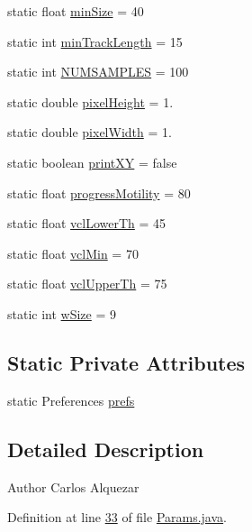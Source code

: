 \begin{DoxyCompactItemize}
static float \hyperlink{classdata_1_1_params_a0aac8d82501e8bd6df290478d853662b}{min\+Size} = 40
\item 
static int \hyperlink{classdata_1_1_params_aa730fe10ba7a04b3871e8ff2ea8cc834}{min\+Track\+Length} = 15
\item 
static int \hyperlink{classdata_1_1_params_ae808f1c980157cfd070c6e09e587e2aa}{N\+U\+M\+S\+A\+M\+P\+L\+ES} = 100
\item 
static double \hyperlink{classdata_1_1_params_a193425ff40a106f84f7980effb603136}{pixel\+Height} = 1.
\item 
static double \hyperlink{classdata_1_1_params_a6bc7d1b46eaf3b2ebdc0bab5d9634c79}{pixel\+Width} = 1.
\item 
static boolean \hyperlink{classdata_1_1_params_ae8b85275ab9c5375a3d35dcb7cd8332f}{print\+XY} = false
\item 
static float \hyperlink{classdata_1_1_params_ae9dd6b8ec81f8ae0b40a4e8e2d9cdc06}{progress\+Motility} = 80
\item 
static float \hyperlink{classdata_1_1_params_af9a2118a2e00978d900279677c64bbeb}{vcl\+Lower\+Th} = 45
\item 
static float \hyperlink{classdata_1_1_params_af4cb43f0bfe24c14e75780187235376c}{vcl\+Min} = 70
\item 
static float \hyperlink{classdata_1_1_params_ae0c29f446e3d569d730c8251a31e7ac2}{vcl\+Upper\+Th} = 75
\item 
static int \hyperlink{classdata_1_1_params_ad1b7844e5f66ee81c3de06d1a8ca645e}{w\+Size} = 9
\end{DoxyCompactItemize}
\subsection*{Static Private Attributes}
\begin{DoxyCompactItemize}
\item 
static Preferences \hyperlink{classdata_1_1_params_a77f70a9d88156f5f7dbdd99bfaaee64e}{prefs}
\end{DoxyCompactItemize}


\subsection{Detailed Description}
\begin{DoxyAuthor}{Author}
Carlos Alquezar 
\end{DoxyAuthor}


Definition at line \hyperlink{_params_8java_source_l00033}{33} of file \hyperlink{_params_8java_source}{Params.\+java}.



